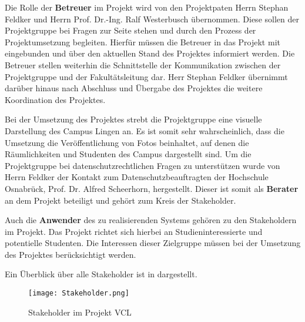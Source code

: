 Die Rolle der \textbf{Betreuer} im Projekt wird von den Projektpaten Herrn Stephan
Feldker und Herrn Prof. Dr.-Ing. Ralf Westerbusch übernommen. Diese sollen der
Projektgruppe bei Fragen zur Seite stehen und durch den Prozess der
Projektumsetzung begleiten. Hierfür müssen die Betreuer in das Projekt mit
eingebunden und über den aktuellen Stand des Projektes informiert werden. Die
Betreuer stellen weiterhin die Schnittstelle der Kommunikation zwischen der
Projektgruppe und der Fakultätsleitung dar. Herr Stephan Feldker übernimmt
darüber hinaus nach Abschluss und Übergabe des Projektes die weitere Koordination des Projektes.

Bei der Umsetzung des Projektes strebt die Projektgruppe eine visuelle
Darstellung des Campus Lingen an. Es ist somit sehr wahrscheinlich, dass die
Umsetzung die Veröffentlichung von Fotos beinhaltet, auf denen die
Räumlichkeiten und Studenten des Campus dargestellt sind. Um die Projektgruppe
bei datenschutzrechtlichen Fragen zu unterstützen wurde von Herrn Feldker der
Kontakt zum Datenschutzbeauftragten der Hochschule Osnabrück, Prof. Dr. Alfred
Scheerhorn, hergestellt. Dieser ist somit als \textbf{Berater} an dem Projekt beteiligt
und gehört zum Kreis der Stakeholder.

Auch die \textbf{Anwender} des zu realisierenden Systems gehören zu den Stakeholdern im
Projekt. Das Projekt richtet sich hierbei an Studieninteressierte und potentielle
Studenten. Die Interessen dieser Zielgruppe müssen bei der Umsetzung des
Projektes berücksichtigt werden.

Ein Überblick über alle Stakeholder ist in  dargestellt.

\clearpage
\begin{figure}[htb] 
\centering
\texttt{[image: Stakeholder.png]}
\caption[Stakeholder im Projekt \acs{VCL}]{Stakeholder im Projekt \acs{VCL}\protect\footnotemark}
\label{fig:Stakeholder}
\end{figure}
